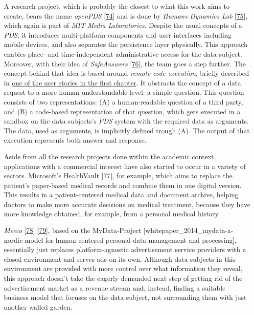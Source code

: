 \documentclass[12pt,english,a4paper,titlepage,cleardoublepage=empty,dottedtoc]{report}
\begin{document}
A research project, which is probably the closest to what this work aims
to create, bears the name \emph{openPDS}
{[}\protect\hyperlink{ref-paper_2012_openpds_on-trusted-use-of-large-scale-personal-data}{74}{]}
and is done by \emph{Humans Dynamics Lab}
{[}\protect\hyperlink{ref-web_mit_openpds-safeanswers-project-page}{75}{]},
which again is part of \emph{MIT Media Laboratories}. Despite the usual
concepts of a \emph{PDS}, it introduces multi-platform components and
user interfaces including mobile devices, and also separates the
persistence layer physically. This approach enables place- and
time-independent administrative access for the data subject. Moreover,
with their idea of \emph{SafeAnswers}
{[}\protect\hyperlink{ref-paper_2014_openpds_protecting-privacy-of-meta-data-through-safeanswers}{76}{]},
the team goes a step further. The concept behind that idea is based
around \emph{remote code execution}, briefly described in
\protect\hyperlink{header-applying-for-a-loan-and-checking-creditworthiness}{one
of the user stories in the first chapter}. It abstracts the concept of a
data request to a more human-understandable level: a simple question.
This question consists of two representations: (A) a human-readable
question of a third party, and (B) a code-based representation of that
question, which gets executed in a sandbox on the data subjects's
\emph{PDS} system with the required data as arguments. The data, used as
arguments, is implicitly defined trough (A). The output of that
execution represents both answer and response.

Aside from all the research projects done within the academic context,
applications with a commercial interest have also started to occur in a
variety of sectors. Microsoft's HealthVault
{[}\protect\hyperlink{ref-web_microsoft_healthvault}{77}{]}, for
example, which aims to replace the patient's paper-based medical records
and combine them in one digital version. This results in a
patient-centered medical data and document archive, helping doctors to
make more accurate decisions on medical treatment, because they have
more knowledge obtained, for example, from a personal medical history.

\emph{Meeco} {[}\protect\hyperlink{ref-web_meeco_how-it-works}{78}{]}
{[}\protect\hyperlink{ref-slides_2015_meeco-case-study}{79}{]}, based on
the MyData-Project
{[}whitepaper\_2014\_mydata-a-nordic-model-for-human-centered-personal-data-management-and-processing{]},
essentially just replaces platform-agnostic advertisement service
providers with a closed environment and serves ads on its own. Although
data subjects in this environment are provided with more control over
what information they reveal, this approach doesn't take the eagerly
demanded next step of getting rid of the advertisement market as a
revenue stream and, instead, finding a suitable business model that
focuses on the data subject, not surrounding them with just another
walled garden.
\end{document}
